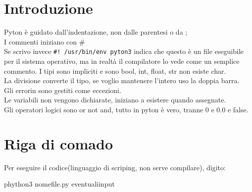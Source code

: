 \chapter{Introduzione}
Pyton è guidato dall'indentazione, non dalle parentesi o da ;\\
I commenti iniziano con \#\\
Se scrivo invece \verb|#! /usr/bin/env pyton3| indica che questo è un file eseguibile per il sistema operativo, ma in realtà il compilatore lo vede come un semplice commento. I tipi sono impliciti e sono bool, int, float, str non esiste char.\\
La divisione converte il tipo, se voglio mantenere l'intero uso la doppia barra.\\
Gli errorin sono gestiti come eccezioni.\\
Le variabili non vengono dichiarate, iniziano a esistere quando assegnate.\\
Gli operatori logici sono or not and, tutto in pyton è vero, tranne 0 e 0.0 e false.\\

\chapter{Riga di comado}
Per eseguire il codice(linguaggio di scriping, non serve compilare), digito:

\begin{tcolorbox}
phython3 nomefile.py eventualiinput
\end{tcolorbox}

